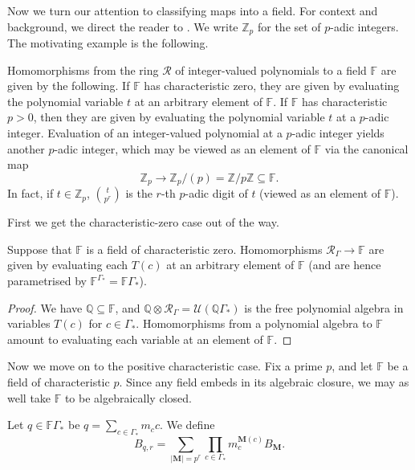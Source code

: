 \documentclass[ALCO,Unicode]{cedram}
\newcommand{\RGamma}{\mathcal{R}_{\Gamma}}
\newcommand{\RGamma}{\mathcal{R}_{\Gamma}}
\begin{document}
Now we turn our attention to classifying maps into a field. For context and background, we direct the reader to \cite{HarmanHopkins}. We write $\mathbb{Z}_p$ for the set of $p$-adic integers. The motivating example is the following.
\begin{example} \label{hom_classification_example}
Homomorphisms from the ring $\mathcal{R}$ of integer-valued polynomials to a field $\mathbb{F}$ are given by the following. If $\mathbb{F}$ has characteristic zero, they are given by evaluating the polynomial variable $t$ at an arbitrary element of $\mathbb{F}$. If $\mathbb{F}$ has characteristic $p>0$, then they are given by evaluating the polynomial variable $t$ at a $p$-adic integer. Evaluation of an integer-valued polynomial at a $p$-adic integer yields another $p$-adic integer, which may be viewed as an element of $\mathbb{F}$ via the canonical map
\[
\mathbb{Z}_p \to \mathbb{Z}_p/(p) = \mathbb{Z}/p\mathbb{Z} \subseteq \mathbb{F}.
\]
In fact, if $t \in \mathbb{Z}_p$, $\binom{t}{p^r}$ is the $r$-th $p$-adic digit of $t$ (viewed as an element of $\mathbb{F}$).
\end{example}

First we get the characteristic-zero case out of the way.
\begin{proposition}
Suppose that $\mathbb{F}$ is a field of characteristic zero. Homomorphisms $\RGamma \to \mathbb{F}$ are given by evaluating each $T(c)$ at an arbitrary element of $\mathbb{F}$ \textup{(}and are hence parametrised by $\mathbb{F}^{\Gamma_*} = \mathbb{F}\Gamma_*$\textup{)}.
\end{proposition}
\begin{proof}
We have $\mathbb{Q} \subseteq \mathbb{F}$, and $\mathbb{Q} \otimes \RGamma = \mathcal{U}(\mathbb{Q}\Gamma_*)$ is the free polynomial algebra in variables $T(c)$ for $c \in \Gamma_*$. Homomorphisms from a polynomial algebra to $\mathbb{F}$ amount to evaluating each variable at an element of $\mathbb{F}$.
\end{proof}

Now we move on to the positive characteristic case. Fix a prime $p$, and let $\mathbb{F}$ be a field of characteristic $p$. Since any field embeds in its algebraic closure, we may as well take $\mathbb{F}$ to be algebraically closed. 
\begin{definition}
Let $q \in \mathbb{F}\Gamma_*$ be $q = \sum_{c \in \Gamma_*} m_c c$. We define
\[
B_{q,r} = \sum_{|\mathbf{M}| = p^r} \prod_{c \in \Gamma_*} m_c^{\mathbf{M}(c)} B_{\mathbf{M}}.
\]
\end{definition}
\end{document}
